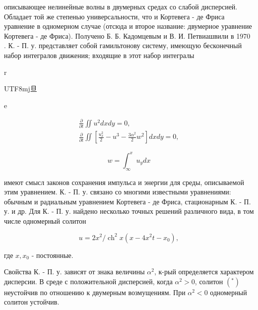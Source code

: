 \documentclass[10pt]{article}
\begin{document}
описывающее нелинейные волны в двумерных средах со слабой дисперсией. Обладает той же степенью универсальности, что и Кортевега - де Фриса уравнение в одномерном случае (отсюда и второе название: двумерное уравнение Кортевега - де Фриса). Получено Б. Б. Кадомцевым и В. И. Петвиашвили в 1970 . К. - П. у. представляет собой гамильтонову систему, имеющую бесконечный набор интегралов движения; входящие в этот набор интегралы



r\begin{CJK}{UTF8}{mj}旦\end{CJK}e



\[

\begin{gathered}

\frac{\partial}{\partial t} \iint u^{2} d x d y=0, \\

\frac{\partial}{\partial t} \iint\left[\frac{u_{x}^{2}}{2}-u^{3}-\frac{3 \alpha^{2}}{2} w^{2}\right] d x d y=0,

\end{gathered}

\]



\[

w=\int_{\infty}^{x} u_{y} d x

\]



имеют смысл законов сохранения импульса и энергии для среды, описываемой этим уравнением. К. - П. у. связано со многими известными уравнениями: обычным и радиальным уравнением Кортевега - де Фриса, стационарным К. - П. у. и др. Для К. - П. у. найдено несколько точных решений различного вида, в том числе одномерный солитон



\[

u=2 x^{2} / \operatorname{ch}^{2} x\left(x-4 x^{2} t-x_{0}\right),

\]



где $x, x_{0}$ - постоянные.



Свойства К. - П. у. зависят от знака величины $\alpha^{2}$, к-рый определяется характером дисперсии. В среде с положительной дисперсией, когда $\alpha^{2}>0$, солитон $\left({ }^{*}\right)$ неустойчив по отношению к двумерным возмущениям. При $\alpha^{2}<0$ одномерный солитон устойчив.
\end{document}
